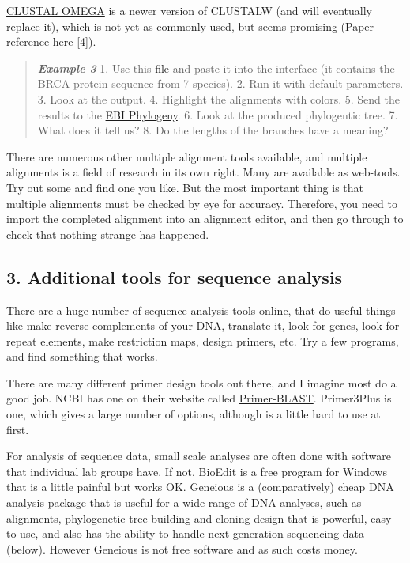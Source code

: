 \documentclass[]{article}
\begin{document}
\href{https://www.ebi.ac.uk/Tools/msa/clustalo/}{CLUSTAL OMEGA} is a
newer version of CLUSTALW (and will eventually replace it), which is not
yet as commonly used, but seems promising (Paper reference here
{[}\href{http://msb.embopress.org/content/7/1/539}{4}{]}).

\begin{quote}
\emph{\textbf{Example 3}} 1. Use this
\href{http://compbio.massey.ac.nz/wiki/data/c1/BRCA2_aa.fasta}{file} and
paste it into the interface (it contains the BRCA protein sequence from
7 species). 2. Run it with default parameters. 3. Look at the output. 4.
Highlight the alignments with colors. 5. Send the results to the
\href{https://www.ebi.ac.uk/Tools/phylogeny/clustalw2_phylogeny/}{EBI
Phylogeny}. 6. Look at the produced phylogentic tree. 7. What does it
tell us? 8. Do the lengths of the branches have a meaning?
\end{quote}

There are numerous other multiple alignment tools available, and
multiple alignments is a field of research in its own right. Many are
available as web-tools. Try out some and find one you like. But the most
important thing is that multiple alignments must be checked by eye for
accuracy. Therefore, you need to import the completed alignment into an
alignment editor, and then go through to check that nothing strange has
happened.

\subsection{3. Additional tools for sequence
analysis}\label{additional-tools-for-sequence-analysis}

There are a huge number of sequence analysis tools online, that do
useful things like make reverse complements of your DNA, translate it,
look for genes, look for repeat elements, make restriction maps, design
primers, etc. Try a few programs, and find something that works.

There are many different primer design tools out there, and I imagine
most do a good job. NCBI has one on their website called
\href{http://www.ncbi.nlm.nih.gov/tools/primer-blast/}{Primer-BLAST}.
Primer3Plus is one, which gives a large number of options, although is a
little hard to use at first.

For analysis of sequence data, small scale analyses are often done with
software that individual lab groups have. If not, BioEdit is a free
program for Windows that is a little painful but works OK. Geneious is a
(comparatively) cheap DNA analysis package that is useful for a wide
range of DNA analyses, such as alignments, phylogenetic tree-building
and cloning design that is powerful, easy to use, and also has the
ability to handle next-generation sequencing data (below). However
Geneious is not free software and as such costs money.
\end{document}
